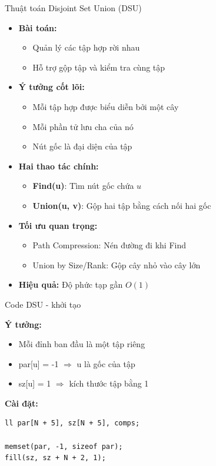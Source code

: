 \documentclass[aspectratio=169]{beamer}
\begin{document}
\begin{frame}{Thuật toán Disjoint Set Union (DSU)}

\begin{itemize}
    \item \textbf{Bài toán:}
    \begin{itemize}
        \item Quản lý các tập hợp rời nhau
        \item Hỗ trợ gộp tập và kiểm tra cùng tập
    \end{itemize}

    \item \textbf{Ý tưởng cốt lõi:}
    \begin{itemize}
        \item Mỗi tập hợp được biểu diễn bởi một cây
        \item Mỗi phần tử lưu cha của nó
        \item Nút gốc là đại diện của tập
    \end{itemize}

    \item \textbf{Hai thao tác chính:}
    \begin{itemize}
        \item \textbf{Find(u)}: Tìm nút gốc chứa $u$
        \item \textbf{Union(u, v)}: Gộp hai tập bằng cách nối hai gốc
    \end{itemize}

    \item \textbf{Tối ưu quan trọng:}
    \begin{itemize}
        \item Path Compression: Nén đường đi khi Find
        \item Union by Size/Rank: Gộp cây nhỏ vào cây lớn
    \end{itemize}

    \item \textbf{Hiệu quả:} Độ phức tạp gần $O(1)$
\end{itemize}

\end{frame}

\begin{frame}[fragile]{Code DSU - khởi tạo}

\textbf{Ý tưởng:}
\begin{itemize}
    \item Mỗi đỉnh ban đầu là một tập riêng
    \item par[u] = -1 $\Rightarrow$ u là gốc của tập
    \item sz[u] = 1 $\Rightarrow$ kích thước tập bằng 1
\end{itemize}

\vspace{6pt}
\textbf{Cài đặt:}

\begin{verbatim}
ll par[N + 5], sz[N + 5], comps;

memset(par, -1, sizeof par);
fill(sz, sz + N + 2, 1);
\end{verbatim}

\end{frame}
\end{document}
